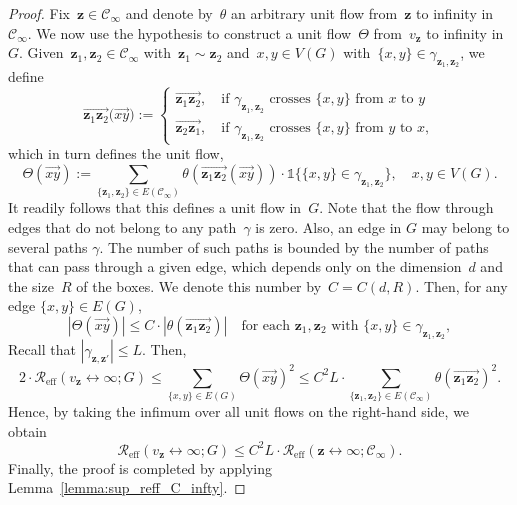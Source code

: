 \documentclass[a4paper,11pt]{article}
\theoremstyle{definition}
\begin{document}
\begin{proof}
Fix~$\mathbf z \in \mathcal C_\infty$ and denote by~$\theta$ an arbitrary unit flow from~$\mathbf z$ to infinity in~$\mathcal C_\infty$. We now use the hypothesis to construct a unit flow~$\Theta$ from~$v_\mathbf{z}$ to infinity in~$G$. Given~$\mathbf z_1,\mathbf z_2 \in \mathcal C_\infty$ with~$\mathbf z_1 \sim \mathbf z_2$ and~$x,y \in V(G)$ with~$\{x,y\} \in \gamma_{\mathbf z_1,\mathbf z_2}$, we define
    \[
        \overrightarrow{\mathbf z_1 \mathbf z_2} \big(\overrightarrow{xy} \big) := \begin{cases}
            \overrightarrow{\mathbf z_1 \mathbf z_2}, \quad \text{if $\gamma_{\mathbf z_1,\mathbf z_2}$ crosses $\{x,y\}$ from $x$ to $y$}\\[2mm]
            \overrightarrow{\mathbf z_2 \mathbf z_1}, \quad \text{if $\gamma_{\mathbf z_1,\mathbf z_2}$ crosses $\{x,y\}$ from $y$ to $x$},
        \end{cases}
    \]
which in turn defines the unit flow,
    \[
        \Theta(\overrightarrow{xy}) := \sum_{ \{\mathbf z_1,\mathbf z_2\} \in E(\mathcal C_\infty) } \theta( \overrightarrow{ \mathbf z_1 \mathbf z_2 }(\overrightarrow{xy}) ) \cdot \mathds{1}\{ \{x,y\} \in \gamma_{\mathbf z_1, \mathbf z_2} \}, \quad x,y \in V(G).
    \]
    It readily follows that this defines a unit flow in~$G$. Note that the flow through edges that do not belong to any path~$\gamma$ is zero. Also, an edge in $G$ may belong to several paths $\gamma$. The number of such paths is bounded by the number of paths that can pass through a given edge, which depends only on the dimension~$d$ and the size~$R$ of the boxes. We denote this number by~$C = C(d,R)$. Then, for any edge $\{x,y\} \in E(G)$,
    \[
        |\Theta(\overrightarrow{xy})| \le C \cdot |\theta( \overrightarrow{\mathbf z_1\mathbf z_2})| \quad \text{for each } \mathbf z_1, \mathbf z_2 \text{ with } \{x,y\} \in \gamma_{\mathbf z_1,\mathbf z_2},  
    \]
    Recall that $|\gamma_{\mathbf z,\mathbf z'}|\le L$. Then,
    \begin{equation*}
        2 \cdot \mathcal{R}_\mathrm{eff}( v_\mathbf{z} \leftrightarrow \infty;G) \leq \sum_{\{x,y\}\in E(G)} \Theta (\overrightarrow{xy})^2 \le C^2L \cdot \sum_{\{\mathbf z_1,\mathbf z_2\}\in E({\mathcal C_\infty})} \theta(\overrightarrow{\mathbf z_1 \mathbf z_2})^2.
    \end{equation*}
    Hence, by taking the infimum over all unit flows on the right-hand side, we obtain
    $$ \mathcal{R}_\mathrm{eff}( v_\mathbf{z} \leftrightarrow \infty;G) \leq C^2 L \cdot \mathcal{R}_\mathrm{eff}( \mathbf{z} \leftrightarrow \infty;\mathcal C_\infty).$$
Finally, the proof is completed by applying Lemma~\ref{lemma:sup_reff_C_infty}.
\end{proof}
\end{document}
